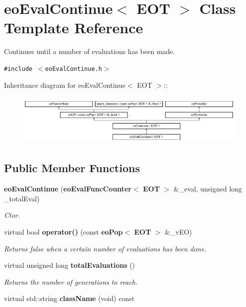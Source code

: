 \section{eo\-Eval\-Continue$<$ EOT $>$ Class Template Reference}
\label{classeo_eval_continue}
Continues until a number of evaluations has been made.  


{\tt \#include $<$eo\-Eval\-Continue.h$>$}

Inheritance diagram for eo\-Eval\-Continue$<$ EOT $>$::\begin{figure}[H]
\begin{center}
\leavevmode
\includegraphics[height=2.52252cm]{classeo_eval_continue}
\end{center}
\end{figure}
\subsection*{Public Member Functions}
\begin{CompactItemize}
\item 
{\bf eo\-Eval\-Continue} ({\bf eo\-Eval\-Func\-Counter}$<$ {\bf EOT} $>$ \&\_\-eval, unsigned long \_\-total\-Eval)\label{classeo_eval_continue_a0}

\begin{CompactList}\small\item\em Ctor. \item\end{CompactList}\item 
virtual bool {\bf operator()} (const {\bf eo\-Pop}$<$ {\bf EOT} $>$ \&\_\-v\-EO)\label{classeo_eval_continue_a1}

\begin{CompactList}\small\item\em Returns false when a certain number of evaluations has been done. \item\end{CompactList}\item 
virtual unsigned long {\bf total\-Evaluations} ()\label{classeo_eval_continue_a2}

\begin{CompactList}\small\item\em Returns the number of generations to reach. \item\end{CompactList}\item 
virtual std::string {\bf class\-Name} (void) const \label{classeo_eval_continue_a3}

\end{CompactItemize}
